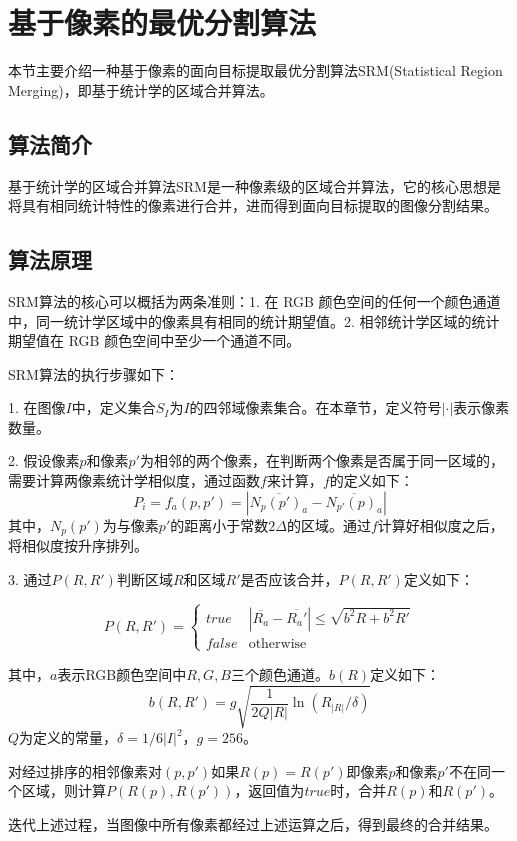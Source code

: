 \section{基于像素的最优分割算法}

本节主要介绍一种基于像素的面向目标提取最优分割算法SRM(Statistical Region Merging)，即基于统计学的区域合并算法。

\subsection{算法简介}

基于统计学的区域合并算法SRM是一种像素级的区域合并算法，它的核心思想是将具有相同统计特性的像素进行合并，进而得到面向目标提取的图像分割结果。

\subsection{算法原理}

SRM算法的核心可以概括为两条准则：1. 在 RGB 颜色空间的任何一个颜色通道中，同一统计学区域中的像素具有相同的统计期望值。2. 相邻统计学区域的统计期望值在 RGB 颜色空间中至少一个通道不同。

SRM算法的执行步骤如下：

1. 在图像$I$中，定义集合$S_I$为$I$的四邻域像素集合。在本章节，定义符号$|\cdot|$表示像素数量。

2. 假设像素$p$和像素$p'$为相邻的两个像素，在判断两个像素是否属于同一区域的，需要计算两像素统计学相似度，通过函数$f$来计算，$f$的定义如下：
$$
P_i=f_a(p,p')=|\overline{N_p(p')_a}-\overline{N_{p'}(p)_a}|
$$
其中，$N_p(p')$为与像素$p'$的距离小于常数$2\Delta$的区域。通过$f$计算好相似度之后，将相似度按升序排列。

3. 通过$P(R,R')$判断区域$R$和区域$R'$是否应该合并，$P(R,R')$定义如下：

\begin{displaymath}
P(R,R') = \left\{ \begin{array}{ll}

true & \textrm{$|\overline{R_a}-\overline{R_a'}|\leq \sqrt{b^2{R}+b^2{R'}}$}\\
false & \textrm{otherwise}

\end{array} \right.
\end{displaymath}


其中，$a$表示RGB颜色空间中${R,G,B}$三个颜色通道。$b(R)$定义如下：
$$
b(R,R' )=g\sqrt{\frac{1}{2Q|R|}\ln{(R_{|R|}/\delta)}}
$$
$Q$为定义的常量，$\delta=1/6|I|^2$，$g=256$。

对经过排序的相邻像素对$(p,p')$如果$R(p)=R(p')$即像素$p$和像素$p'$不在同一个区域，则计算$P(R(p),R(p'))$，返回值为$true$时，合并$R(p)$和$R(p')$。

迭代上述过程，当图像中所有像素都经过上述运算之后，得到最终的合并结果。
